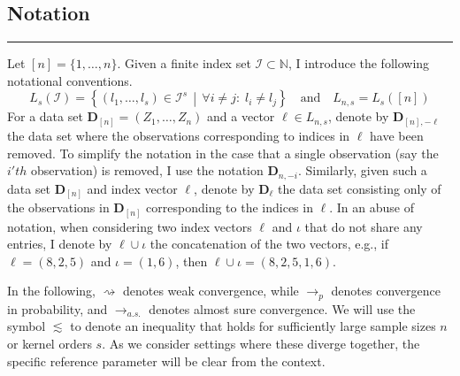 \subsection{Notation}
\hrule
Let $[n] = \{1, \dotsc, n\}$.
Given a finite index set $\mathcal{I} \subset \mathbb{N}$, I introduce the following notational conventions.
\begin{equation}
	L_{s}(\mathcal{I}) = \left\{\left(l_1, \dotsc, l_s\right) \in \mathcal{I}^{s} \, \middle| \, \forall i \neq j: \; l_i \neq l_j\right\}
	\quad \text{and} \quad
	L_{n,s} = L_s\left([n]\right)
\end{equation}
For a data set $\mathbf{D}_{[n]} = \left(Z_1, \dotsc, Z_{n}\right)$ and a vector $\ell \in L_{n,s}$, denote by $\mathbf{D}_{[n], -\ell}$ the data set where the observations corresponding to indices in $\ell$ have been removed.
To simplify the notation in the case that a single observation (say the $i'th$ observation) is removed, I use the notation $\mathbf{D}_{n, -i}$.
Similarly, given such a data set $\mathbf{D}_{[n]}$ and index vector $\ell$, denote by $\mathbf{D}_{\ell}$ the data set consisting only of the observations in $\mathbf{D}_{[n]}$ corresponding to the indices in $\ell$.
In an abuse of notation, when considering two index vectors $\ell$ and $\iota$ that do not share any entries, I denote by $\ell \cup \iota$ the concatenation of the two vectors, e.g., if $\ell = (8,2,5)$ and $\iota = (1,6)$, then $\ell \cup \iota = (8,2,5,1,6)$.

In the following, $\rightsquigarrow$ denotes weak convergence, while
$\rightarrow_{p}$ denotes convergence in probability, and $\rightarrow_{a.s.}$
denotes almost sure convergence. We will use the symbol $\lesssim$ to denote an
inequality that holds for sufficiently large sample sizes $n$ or kernel orders
$s$. As we consider settings where these diverge together, the specific
reference parameter will be clear from the context.

